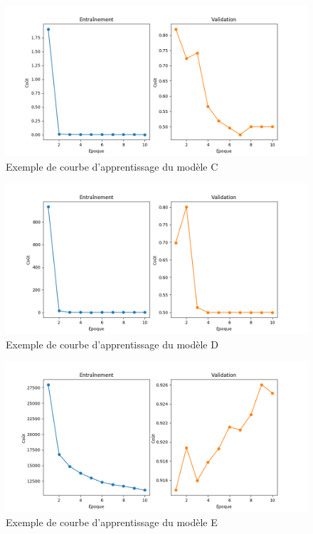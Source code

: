     \begin{figure}
        \centering
        \includegraphics[width=16cm]{images/learning_curves_c.png}
        \caption{Exemple de courbe d'apprentissage du modèle C}
        \label{fig:learning_curves_c}
    \end{figure}

    \begin{figure}
        \centering
        \includegraphics[width=16cm]{images/learning_curves_d.png}
        \caption{Exemple de courbe d'apprentissage du modèle D}
        \label{fig:learning_curves_d}
    \end{figure}

    \begin{figure}
        \centering
        \includegraphics[width=16cm]{images/learning_curves_e.png}
        \caption{Exemple de courbe d'apprentissage du modèle E}
        \label{fig:learning_curves_e}
    \end{figure}

